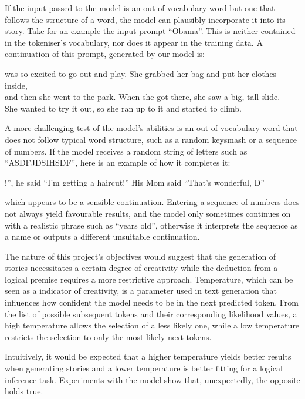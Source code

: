 \documentclass[11pt]{article}
\begin{document}
    If the input passed to the model is an out-of-vocabulary word but one that follows the structure of a word, the model can plausibly incorporate it into its story.
    Take for an example the input prompt “Obama”. This is neither contained in the tokeniser's vocabulary, nor does it appear in the training data.
    A continuation of this prompt, generated by our model is:
    \begin{center}
        was so excited to go out and play. She grabbed her bag and put her clothes inside,\\
        and then she went to the park. When she got there, she saw a big, tall slide.\\
        She wanted to try it out, so she ran up to it and started to climb.
    \end{center}

    A more challenging test of the model's abilities is an out-of-vocabulary word that does not follow typical word structure, such as a random keysmash or a sequence of numbers.
    If the model receives a random string of letters such as “ASDFJDSIHSDF”, here is an example of how it completes it:
    \begin{center}
        !”, he said “I'm getting a haircut!”  His Mom said “That's wonderful, D”\\
    \end{center}

    which appears to be a sensible continuation.
    Entering a sequence of numbers does not always yield favourable results, and the model only sometimes continues on with a realistic phrase such as “years old”, otherwise it interprets the sequence as a name or outputs a different unsuitable continuation.

    The nature of this project's objectives would suggest that the generation of stories necessitates a certain
    degree of creativity while the deduction from a logical premise requires a more restrictive approach.
    Temperature, which can be seen as a indicator of creativity, is a parameter used in text generation that influences how confident the model needs to be
    in the next predicted token. From the list of possible subsequent tokens and their corresponding likelihood values, a high temperature allows the selection of a less likely one, while a low temperature restricts the selection to only the most likely next tokens.

    Intuitively, it would be expected that a higher temperature yields better results when generating stories and a lower temperature is better fitting for a logical inference task.
    Experiments with the model show that, unexpectedly, the opposite holds true.
\end{document}
